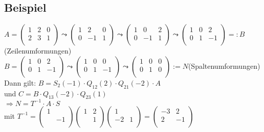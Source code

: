 \documentclass[a4paper,twoside]{article}
\begin{document}
\subsection*{Beispiel}
$
A = 
\left(\begin{matrix} 
1 & 2 & 0 \\
2 & 3 & 1 \\
\end{matrix} \right) \leadsto
\left(\begin{matrix} 
1 & 2 & 0 \\
0 & -1 & 1 \\
\end{matrix} \right) \leadsto
\left(\begin{matrix} 
1 & 0 & 2 \\
0 & -1 & 1 \\
\end{matrix} \right) \leadsto
\left(\begin{matrix} 
1 & 0 & 2 \\
0 & 1 & -1 \\
\end{matrix} \right) =: B
$ (Zeilenumformungen)\\
$
B = \left(\begin{matrix} 
1 & 0 & 2 \\
0 & 1 & -1 \\
\end{matrix} \right) \leadsto
\left(\begin{matrix} 
1 & 0 & 0 \\
0 & 1 & -1 \\
\end{matrix} \right) \leadsto
\left(\begin{matrix} 
1 & 0 & 0 \\
0 & 1 & 0 \\
\end{matrix} \right) := N
$(Spaltenumformungen)\\
Dann gilt: $B = S_2(-1)\cdot Q_{12}(2)\cdot Q_{21}(-2)\cdot A$\\
und $C = B \cdot Q_{13}(-2) \cdot Q_{23}(1)$\\
$\Rightarrow N = T^{-1}\cdot A \cdot S$\\
mit $T^{-1} =\left(\begin{matrix} 
1 \\
& -1 \\
\end{matrix} \right)\left(\begin{matrix} 
1 & 2 \\
& 1 \\
\end{matrix} \right)\left(\begin{matrix} 
1 \\
-2 & 1\\
\end{matrix} \right) = \left(\begin{matrix} 
-3 & 2\\
2 & -1\\
\end{matrix} \right)$ \\
\end{document}
